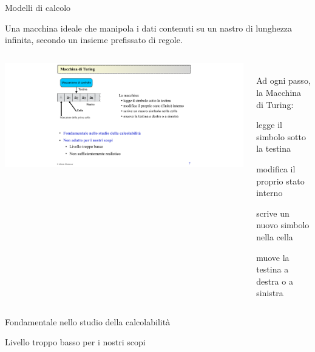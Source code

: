 \begin{frame}{Modelli di calcolo}
	
\vspace{-9pt}
\begin{myboxtitle}
Una macchina ideale che manipola i dati contenuti su un nastro di lunghezza
infinita, secondo un insieme prefissato di regole.
\begin{columns}[T]
\begin{column}{0.28\textwidth}
\includegraphics[width=\textwidth]{turing.pdf}
\end{column}
\begin{column}{0.58\textwidth}
~\\
Ad ogni passo, la Macchina di Turing:
\BI
\item legge il simbolo sotto la testina
\item modifica il proprio stato interno
\item scrive un nuovo simbolo nella cella
\item muove la testina a destra o a sinistra
\EI
\end{column}
\end{columns}
\end{myboxtitle}

\smallskip	
\BI
\item Fondamentale nello studio della calcolabilità
\item Livello troppo basso per i nostri scopi
\EI
\end{frame}

